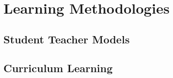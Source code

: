 \section{Learning Methodologies} 

  \subsection{Student Teacher Models} 

  \subsection{Curriculum Learning} 

